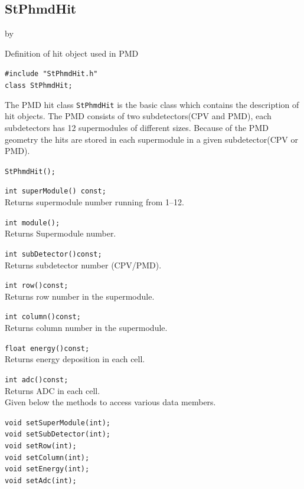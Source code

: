 \documentclass[twoside]{article}
\newcommand{\entrylabel}[1]{\mbox{\textbf{{#1}}}\hfil}%
\newenvironment{entry}
{\begin{list}{}%
    {\renewcommand{\makelabel}{\entrylabel}%
     \setlength{\labelwidth}{90pt}%
     \setlength{\leftmargin}{\labelwidth}
     \advance\leftmargin by \labelsep%
      }%
    }%
  {\end{list}}
\newcommand{\Entrylabel}[1]%
{\raisebox{0pt}[1ex][0pt]{\makebox[\labelwidth][l]%
    {\parbox[t]{\labelwidth}{\hspace{0pt}\textbf{{#1}}}}}}
\newenvironment{Entry}%
{\renewcommand{\entrylabel}{\Entrylabel}\begin{entry}}%
  {\end{entry}}
\begin{document}
\subsection{StPhmdHit}
\label{sec:StPhmdHit}
\begin{Entry}
\item[Summary] 
      Definition of hit object used in PMD
\item[Synopsis]
    \verb+#include "StPhmdHit.h"+\\
    \verb+class StPhmdHit;+\\
\item[Description]
 The PMD hit class \texttt{StPhmdHit} is the basic class which contains
the description of hit objects. The PMD consists of two subdetectors(CPV and PMD),
each subdetectors has 12 supermodules of different sizes. Because of the
PMD geometry the hits are stored in each supermodule in a given subdetector(CPV or PMD). 
 
\item[Related Classes]
\item[Public\\ Constructors]
    \verb+StPhmdHit();+\\

\item[Public Member\\ Functions]
    \verb+int superModule() const;+\\
    Returns supermodule number running from 1--12.

    \verb+int module();+\\
    Returns Supermodule number.

    \verb+int subDetector()const;+\\
    Returns subdetector number (CPV/PMD).

    \verb+int row()const;+\\
    Returns row number in the supermodule.

    \verb+int column()const;+\\
    Returns column number in the supermodule.

    \verb+float energy()const;+\\
    Returns energy deposition in each cell.

    \verb+int adc()const;+\\
    Returns ADC in each cell.\\

Given below the methods to access various data members.

    \verb+void setSuperModule(int);+\\
    \verb+void setSubDetector(int);+\\
    \verb+void setRow(int);+\\
    \verb+void setColumn(int);+\\
    \verb+void setEnergy(int);+\\
    \verb+void setAdc(int);+\\
\end{Entry}
\clearpage
\end{document}
